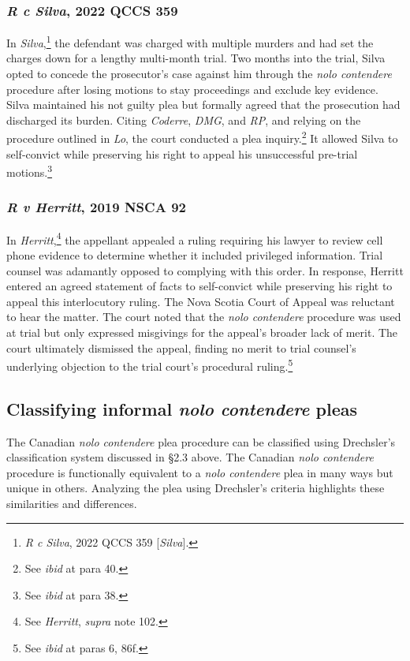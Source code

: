 \subsubsection{\textit{R c Silva}, 2022 QCCS 359}

In \textit{Silva},\footnote{\textit{R c Silva}, 2022 QCCS 359 [\textit{Silva}].} the defendant was charged with multiple murders and had set the charges down for a lengthy multi-month trial. Two months into the trial, Silva opted to concede the prosecutor's case against him through the \textit{nolo contendere} procedure after losing motions to stay proceedings and exclude key evidence. Silva maintained his not guilty plea but formally agreed that the prosecution had discharged its burden. Citing \textit{Coderre}, \textit{DMG}, and \textit{RP}, and relying on the procedure outlined in \textit{Lo}, the court conducted a plea inquiry.\footnote{See \textit{ibid} at para 40.} It allowed Silva to self-convict while preserving his right to appeal his unsuccessful pre-trial motions.\footnote{See \textit{ibid} at para 38.}

\subsubsection{\textit{R v Herritt}, 2019 NSCA 92}

In \textit{Herritt},\footnote{See \textit{Herritt}, \textit{supra} note 102.} the appellant appealed a ruling requiring his lawyer to review cell phone evidence to determine whether it included privileged information. Trial counsel was adamantly opposed to complying with this order. In response, Herritt entered an agreed statement of facts to self-convict while preserving his right to appeal this interlocutory ruling. The Nova Scotia Court of Appeal was reluctant to hear the matter. The court noted that the \textit{nolo contendere} procedure was used at trial but only expressed misgivings for the appeal's broader lack of merit. The court ultimately dismissed the appeal, finding no merit to trial counsel's underlying objection to the trial court's procedural ruling.\footnote{See \textit{ibid} at paras 6, 86f.}

\subsection{Classifying informal \textit{nolo contendere} pleas}

The Canadian \textit{nolo contendere} plea procedure can be classified using Drechsler's classification system discussed in §2.3 above. The Canadian \textit{nolo contendere} procedure is functionally equivalent to a \textit{nolo contendere} plea in many ways but unique in others. Analyzing the plea using Drechsler's criteria highlights these similarities and differences.

